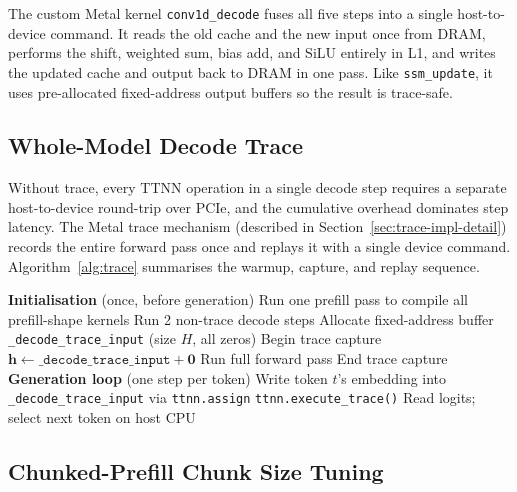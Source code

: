The custom Metal kernel \texttt{conv1d\_decode} fuses all five steps into a single host-to-device command. It reads the old cache and the new input once from DRAM, performs the shift, weighted sum, bias add, and SiLU entirely in L1, and writes the updated cache and output back to DRAM in one pass. Like \texttt{ssm\_update}, it uses pre-allocated fixed-address output buffers so the result is trace-safe.

\subsection{Whole-Model Decode Trace}
\label{sec:trace-impl}

Without trace, every TTNN operation in a single decode step requires a separate host-to-device round-trip over PCIe, and the cumulative overhead dominates step latency. The Metal trace mechanism (described in Section~\ref{sec:trace-impl-detail}) records the entire forward pass once and replays it with a single device command. Algorithm~\ref{alg:trace} summarises the warmup, capture, and replay sequence.

\begin{algorithm}[h]
\caption{Decode trace: warmup, capture, and replay}
\label{alg:trace}
\begin{algorithmic}[1]
\Statex \textbf{Initialisation} (once, before generation)
\State Run one prefill pass to compile all prefill-shape kernels
\State Run 2 non-trace decode steps 
\State Allocate fixed-address buffer \texttt{\_decode\_trace\_input} (size $H$, all zeros)
\State Begin trace capture
\State \hspace{1em} $\mathbf{h} \leftarrow \mathtt{\_decode\_trace\_input} + \mathbf{0}$
\State \hspace{1em} Run full forward pass
\State End trace capture
\Statex
\Statex \textbf{Generation loop} (one step per token)
  \State Write token $t$'s embedding into \texttt{\_decode\_trace\_input} via \texttt{ttnn.assign}
  \State \texttt{ttnn.execute\_trace()}
  \State Read logits; select next token on host CPU
\EndFor
\end{algorithmic}
\end{algorithm}

\subsection{Chunked-Prefill Chunk Size Tuning}
\label{sec:chunk-tune}


